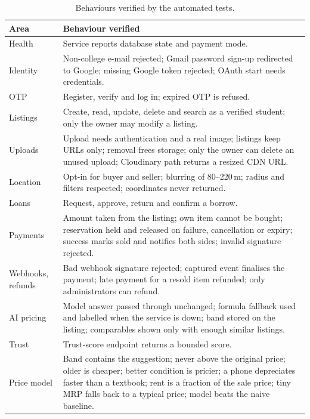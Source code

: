 \documentclass[11pt,letterpaper,oneside]{report}
\begin{document}
\begin{table}[h]
\centering
\caption{Behaviours verified by the automated tests.}\label{tab:tests}
\small
\begin{tabularx}{\textwidth}{@{}L{2.0cm}X@{}}
\toprule
\textbf{Area} & \textbf{Behaviour verified}\\
\midrule
Health & Service reports database state and payment mode.\\
Identity & Non-college e-mail rejected; Gmail password sign-up redirected to Google; missing Google token
rejected; OAuth start needs credentials.\\
OTP & Register, verify and log in; expired OTP is refused.\\
Listings & Create, read, update, delete and search as a verified student; only the owner may modify a listing.\\
Uploads & Upload needs authentication and a real image; listings keep URLs only; removal frees storage;
only the owner can delete an unused upload; Cloudinary path returns a resized CDN URL.\\
Location & Opt-in for buyer and seller; blurring of 80--220\,m; radius and filters respected; coordinates
never returned.\\
Loans & Request, approve, return and confirm a borrow.\\
Payments & Amount taken from the listing; own item cannot be bought; reservation held and released on
failure, cancellation or expiry; success marks sold and notifies both sides; invalid signature rejected.\\
Webhooks, refunds & Bad webhook signature rejected; captured event finalises the payment; late payment for
a resold item refunded; only administrators can refund.\\
AI pricing & Model answer passed through unchanged; formula fallback used and labelled when the service is
down; band stored on the listing; comparables shown only with enough similar listings.\\
Trust & Trust-score endpoint returns a bounded score.\\
Price model & Band contains the suggestion; never above the original price; older is cheaper; better condition
is pricier; a phone depreciates faster than a textbook; rent is a fraction of the sale price; tiny MRP falls
back to a typical price; model beats the naive baseline.\\
\bottomrule
\end{tabularx}
\end{table}
\end{document}
